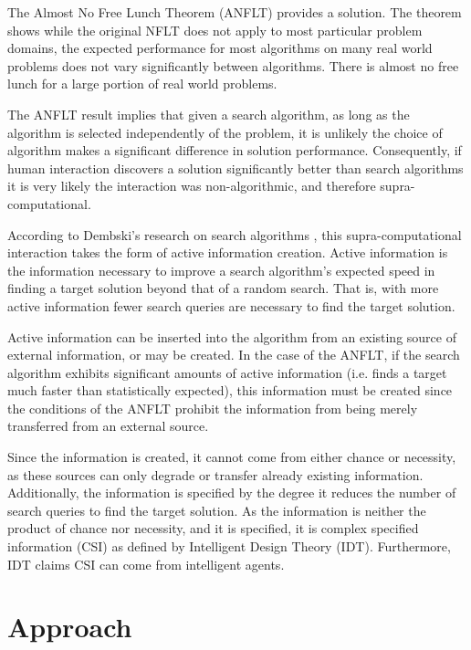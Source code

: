 The Almost No Free Lunch Theorem (ANFLT) \cite{droste02:_optim_with_random_searc_heuris} provides a solution.   The theorem shows while the original NFLT does not apply to most particular problem domains, the expected performance for most algorithms on many real world problems does not vary significantly between algorithms.  There is almost no free lunch for a large portion of real world problems. 

The ANFLT result implies that given a search algorithm, as long as the algorithm is selected independently of the problem, it is unlikely the choice of algorithm  makes a significant difference in solution performance.  Consequently, if human interaction discovers a solution significantly better than search algorithms it is very likely the interaction was non-algorithmic, and therefore supra-computational.

According to Dembski's research on search algorithms \cite{dembski10:_searc_for_searc}, this supra-computational interaction takes the form of active information creation.  Active information is the information necessary to improve a search algorithm's expected speed in finding a target solution beyond that of a random search.  That is, with more active information fewer search queries are necessary to find the target solution.   

Active information can be inserted into the algorithm from an existing source of external information, or may be created.  In the case of the ANFLT, if the search algorithm exhibits significant amounts of active information (i.e. finds a target much faster than statistically expected), this information must be created since the conditions of the ANFLT prohibit the information from being merely transferred from an external source.  

Since the information is created, it cannot come from either chance or necessity, as these sources can only degrade or transfer already existing information.  Additionally, the information is specified by the degree it reduces the number of search queries to find the target solution.  As the information is neither the product of chance nor necessity, and it is specified, it is complex specified information (CSI) \cite{dembski:_specif} as defined by Intelligent Design Theory (IDT).  Furthermore, IDT claims CSI can come from intelligent agents.

\section{Approach}\label{sec:solution-approach}

